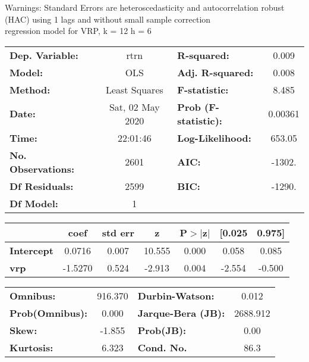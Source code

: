 Warnings: \newline
 [1] Standard Errors are heteroscedasticity and autocorrelation robust (HAC) using 1 lags and without small sample correction\\ 

regression model for VRP, k = 12 h = 6\begin{center}
\begin{tabular}{lclc}
\toprule
\textbf{Dep. Variable:}    &       rtrn       & \textbf{  R-squared:         } &     0.009   \\
\textbf{Model:}            &       OLS        & \textbf{  Adj. R-squared:    } &     0.008   \\
\textbf{Method:}           &  Least Squares   & \textbf{  F-statistic:       } &     8.485   \\
\textbf{Date:}             & Sat, 02 May 2020 & \textbf{  Prob (F-statistic):} &  0.00361    \\
\textbf{Time:}             &     22:01:46     & \textbf{  Log-Likelihood:    } &    653.05   \\
\textbf{No. Observations:} &        2601      & \textbf{  AIC:               } &    -1302.   \\
\textbf{Df Residuals:}     &        2599      & \textbf{  BIC:               } &    -1290.   \\
\textbf{Df Model:}         &           1      & \textbf{                     } &             \\
\bottomrule
\end{tabular}
\begin{tabular}{lcccccc}
                   & \textbf{coef} & \textbf{std err} & \textbf{z} & \textbf{P$> |$z$|$} & \textbf{[0.025} & \textbf{0.975]}  \\
\midrule
\textbf{Intercept} &       0.0716  &        0.007     &    10.555  &         0.000        &        0.058    &        0.085     \\
\textbf{vrp}       &      -1.5270  &        0.524     &    -2.913  &         0.004        &       -2.554    &       -0.500     \\
\bottomrule
\end{tabular}
\begin{tabular}{lclc}
\textbf{Omnibus:}       & 916.370 & \textbf{  Durbin-Watson:     } &    0.012  \\
\textbf{Prob(Omnibus):} &   0.000 & \textbf{  Jarque-Bera (JB):  } & 2688.912  \\
\textbf{Skew:}          &  -1.855 & \textbf{  Prob(JB):          } &     0.00  \\
\textbf{Kurtosis:}      &   6.323 & \textbf{  Cond. No.          } &     86.3  \\
\bottomrule
\end{tabular}
\end{center}


